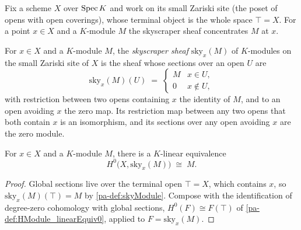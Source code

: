 Fix a scheme \(X\) over \(\operatorname{Spec} K\) and work on its small Zariski site (the poset of opens with
open coverings), whose terminal object is the whole space \(\top = X\). For a point \(x \in X\)
and a \(K\)-module \(M\) the skyscraper sheaf concentrates \(M\) at \(x\).

\begin{definition}
  \label{pa-def:skyModule}
  \leanok

  For \(x \in X\) and a \(K\)-module \(M\), the \emph{skyscraper sheaf} \(\mathrm{sky}_x(M)\) of
  \(K\)-modules on the small Zariski site of \(X\) is the sheaf whose sections over an open
  \(U\) are
  \[
    \mathrm{sky}_x(M)(U) \;=\;
      \begin{cases} M & x \in U, \\ 0 & x \notin U, \end{cases}
  \]
  with restriction between two opens containing \(x\) the identity of \(M\), and to an open
  avoiding \(x\) the zero map. Its restriction map between any two opens that both contain \(x\)
  is an isomorphism, and its sections over any open avoiding \(x\) are the zero module.
\end{definition}

\begin{definition}
  \label{pa-def:skyModuleGammaEquiv}
  \leanok

  For \(x \in X\) and a \(K\)-module \(M\), there is a \(K\)-linear equivalence
  \[
    H^0\bigl(X, \mathrm{sky}_x(M)\bigr) \;\cong\; M .
  \]
\end{definition}
\begin{proof}
  \leanok
  Global sections live over the terminal open \(\top = X\), which contains \(x\), so
  \(\mathrm{sky}_x(M)(\top) = M\) by \ref{pa-def:skyModule}. Compose with the identification of
  degree-zero cohomology with global sections, \(H^0(F) \cong F(\top)\) of
  \ref{pa-def:HModule_linearEquiv0}, applied to \(F = \mathrm{sky}_x(M)\).
\end{proof}

